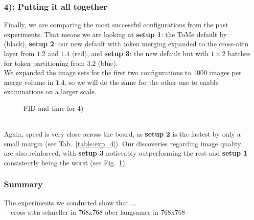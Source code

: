 \newpage
\subsubsection*{4): Putting it all together}
Finally, we are comparing the most successful configurations from the past experiments. That means we are looking at \textbf{setup 1}: the ToMe default by \cite{bolya2023tomesd} (black), \textbf{setup 2}: our new default with token merging expanded to the cross-attn layer from \(1.2\) and \(1.4\) (red), and \textbf{setup 3}: the new default but with $1 \times 2$ batches for token partitioning from \(3.2\) (blue).\\
We expanded the image sets for the first two configurations to 1000 images per merge volume in \(1.4\), so we will do the same for the other one to enable examinations on a larger scale.
\begin{figure}[!htb]
    
    
\caption{FID and time for 4)}
\label{fig:exp_4}
\end{figure}\\
Again, speed is very close across the board, as \textbf{setup 2} is the fastest by only a small margin (see Tab.~\ref{table:exp_4}).
Our discoveries regarding image quality are also reinforced, with \textbf{setup 3} noticeably outperforming the rest and \textbf{setup 1} consistently being the worst (see Fig.~\ref{fig:exp_4}).\\



\subsubsection*{Summary}
The experiments we conducted show that ...\\
---cross-attn schneller in 768x768 aber langsamer in 768x768---